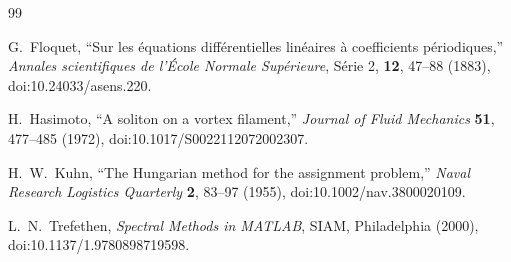 \begin{thebibliography}{99}

G.~Floquet,
``Sur les équations différentielles linéaires à coefficients périodiques,''
\textit{Annales scientifiques de l'École Normale Supérieure}, Série 2,
\textbf{12}, 47--88 (1883),
doi:10.24033/asens.220.

H.~Hasimoto,
``A soliton on a vortex filament,''
\textit{Journal of Fluid Mechanics} \textbf{51}, 477--485 (1972),
doi:10.1017/S0022112072002307.

H.~W.~Kuhn,
``The Hungarian method for the assignment problem,''
\textit{Naval Research Logistics Quarterly} \textbf{2}, 83--97 (1955),
doi:10.1002/nav.3800020109.

L.~N.~Trefethen,
\textit{Spectral Methods in MATLAB},
SIAM, Philadelphia (2000),
doi:10.1137/1.9780898719598.

\end{thebibliography}
